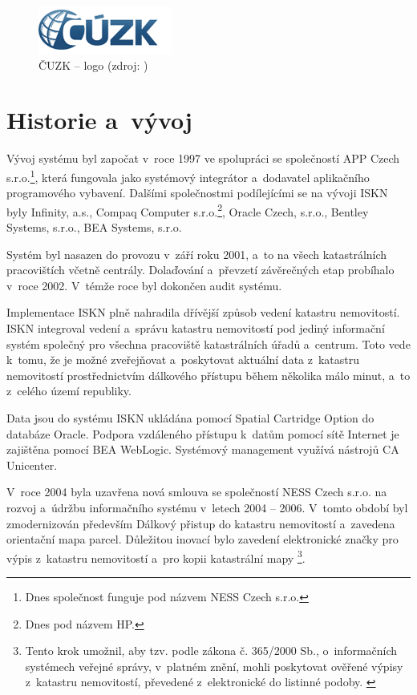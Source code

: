 \documentclass[a4paper,12pt,oneside]{book}
\begin{document}
\begin{figure}[htb]
\centering
\includegraphics[scale=1]{images/cuzk-logo.png}
\caption[ČUZK -- logo]{ČUZK -- logo (zdroj: \cite{iskn})}
\end{figure}

\section{Historie a~vývoj}

Vývoj systému byl započat v~roce 1997 ve spolupráci se společností APP Czech s.r.o.\footnote{Dnes společnost funguje pod názvem NESS Czech s.r.o.}, která fungovala jako systémový integrátor a~dodavatel aplikačního programového vybavení. Dalšími společnostmi podílejícími se na vývoji ISKN byly Infinity, a.s., Compaq Computer s.r.o.\footnote{Dnes pod názvem HP.}, Oracle Czech, s.r.o., Bentley Systems, s.r.o., BEA Systems, s.r.o. \cite{iskn}

Systém byl nasazen do provozu v~září roku 2001, a~to na všech katastrálních pracovištích včetně centrály. Dolaďování a~převzetí závěrečných etap probíhalo v~roce 2002. V~témže roce byl dokončen audit systému. \cite{iskn}

Implementace ISKN plně nahradila dřívější způsob vedení katastru nemovitostí. ISKN integroval vedení a~správu katastru nemovitostí pod jediný informační systém společný pro všechna pracoviště katastrálních úřadů a~centrum. Toto vede k~tomu, že je možné zveřejňovat a~poskytovat aktuální data z~katastru nemovitostí prostřednictvím dálkového přístupu během několika málo minut, a~to z~celého území republiky. \cite{iskn}

Data jsou do systému ISKN ukládána pomocí Spatial Cartridge Option do databáze Oracle. Podpora vzdáleného přístupu k~datům pomocí sítě Internet je zajištěna pomocí BEA WebLogic. Systémový management využívá nástrojů CA Unicenter. \cite{iskn}

V~roce 2004 byla uzavřena nová smlouva se společností NESS Czech s.r.o. na rozvoj a~údržbu informačního systému v~letech 2004 -- 2006. V~tomto období byl zmodernizován především Dálkový přistup do katastru nemovitostí a~zavedena orientační mapa parcel. Důležitou inovací  bylo zavedení elektronické značky pro výpis z~katastru nemovitostí a~pro kopii katastrální mapy \footnote{Tento krok umožnil, aby tzv.  podle zákona č. 365/2000 Sb., o~informačních systémech veřejné správy, v~platném znění, mohli poskytovat ověřené výpisy z~katastru nemovitostí, převedené z~elektronické do listinné podoby. \cite{iskn}}. \cite{iskn}
\end{document}
